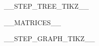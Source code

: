 \noindent\begin{minipage}[t]{0.46\textwidth}\vspace{0pt}
__STEP_TREE_TIKZ__
\end{minipage}\hfill%
\noindent\begin{minipage}[t]{0.52\textwidth}\vspace{0pt}
\begingroup
\setlength{\textwidth}{\linewidth}
\begin{center}
__MATRICES__
\end{center}
\endgroup

\vspace{0.5em}

__STEP_GRAPH_TIKZ__
\end{minipage}
